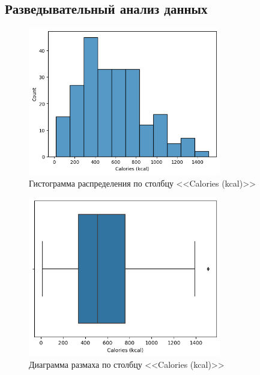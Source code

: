 \documentclass[14pt, a4paper]{article}
\begin{document}
    \subsection{Разведывательный анализ данных}
    
    \begin{figure}[H]
        \centering
        \includegraphics[width=0.75\textwidth]{images/histogram.png}
        \caption{Гистограмма распределения по столбцу <<Calories (kcal)>>}
    \end{figure}

    \begin{figure}[H]
        \centering
        \includegraphics[width=0.75\textwidth]{images/boxplot.png}
        \caption{Диаграмма размаха по столбцу <<Calories (kcal)>>}
    \end{figure}
\end{document}
